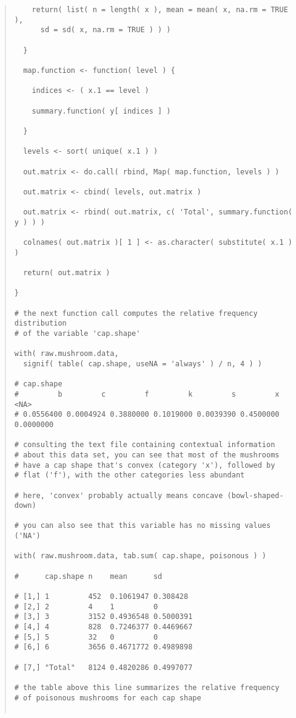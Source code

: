 \documentclass[12pt]{article}
\begin{document}
\begin{quote}
\begin{verbatim}
    return( list( n = length( x ), mean = mean( x, na.rm = TRUE ), 
      sd = sd( x, na.rm = TRUE ) ) )

  }

  map.function <- function( level ) {

    indices <- ( x.1 == level )

    summary.function( y[ indices ] )

  }
  
  levels <- sort( unique( x.1 ) )

  out.matrix <- do.call( rbind, Map( map.function, levels ) )

  out.matrix <- cbind( levels, out.matrix )

  out.matrix <- rbind( out.matrix, c( 'Total', summary.function( y ) ) )

  colnames( out.matrix )[ 1 ] <- as.character( substitute( x.1 ) )

  return( out.matrix )

}

# the next function call computes the relative frequency distribution
# of the variable 'cap.shape'

with( raw.mushroom.data, 
  signif( table( cap.shape, useNA = 'always' ) / n, 4 ) )

# cap.shape
#         b         c         f         k         s         x      <NA> 
# 0.0556400 0.0004924 0.3880000 0.1019000 0.0039390 0.4500000 0.0000000

# consulting the text file containing contextual information
# about this data set, you can see that most of the mushrooms
# have a cap shape that's convex (category 'x'), followed by
# flat ('f'), with the other categories less abundant

# here, 'convex' probably actually means concave (bowl-shaped-down)

# you can also see that this variable has no missing values ('NA')

with( raw.mushroom.data, tab.sum( cap.shape, poisonous ) )

#      cap.shape n    mean      sd       

# [1,] 1         452  0.1061947 0.308428 
# [2,] 2         4    1         0        
# [3,] 3         3152 0.4936548 0.5000391
# [4,] 4         828  0.7246377 0.4469667
# [5,] 5         32   0         0        
# [6,] 6         3656 0.4671772 0.4989898

# [7,] "Total"   8124 0.4820286 0.4997077

# the table above this line summarizes the relative frequency 
# of poisonous mushrooms for each cap shape


\end{verbatim}
\end{quote}
\end{document}
